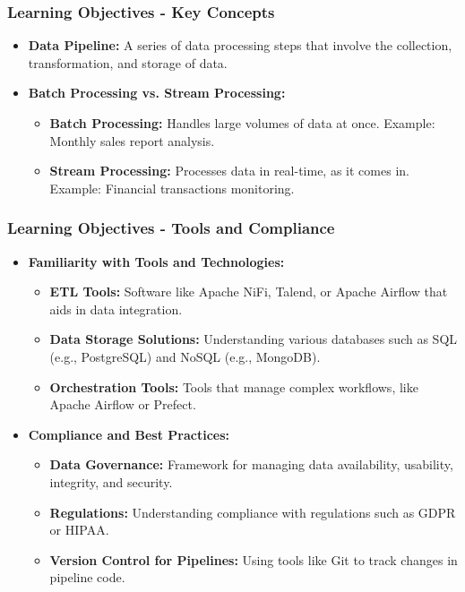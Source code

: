 \documentclass{beamer}
\begin{document}
\begin{frame}[fragile]
    \frametitle{Learning Objectives - Key Concepts}
    \begin{itemize}
        \item \textbf{Data Pipeline:} A series of data processing steps that involve the collection, transformation, and storage of data.
        
        \item \textbf{Batch Processing vs. Stream Processing:} 
            \begin{itemize}
                \item \textbf{Batch Processing:} Handles large volumes of data at once. Example: Monthly sales report analysis.
                \item \textbf{Stream Processing:} Processes data in real-time, as it comes in. Example: Financial transactions monitoring.
            \end{itemize}
    \end{itemize}
\end{frame}

\begin{frame}[fragile]
    \frametitle{Learning Objectives - Tools and Compliance}
    \begin{itemize}
        \item \textbf{Familiarity with Tools and Technologies:}
            \begin{itemize}
                \item \textbf{ETL Tools:} Software like Apache NiFi, Talend, or Apache Airflow that aids in data integration.
                \item \textbf{Data Storage Solutions:} Understanding various databases such as SQL (e.g., PostgreSQL) and NoSQL (e.g., MongoDB).
                \item \textbf{Orchestration Tools:} Tools that manage complex workflows, like Apache Airflow or Prefect.
            \end{itemize}
        
        \item \textbf{Compliance and Best Practices:}
            \begin{itemize}
                \item \textbf{Data Governance:} Framework for managing data availability, usability, integrity, and security.
                \item \textbf{Regulations:} Understanding compliance with regulations such as GDPR or HIPAA.
                \item \textbf{Version Control for Pipelines:} Using tools like Git to track changes in pipeline code.
            \end{itemize}
    \end{itemize}
\end{frame}
\end{document}
